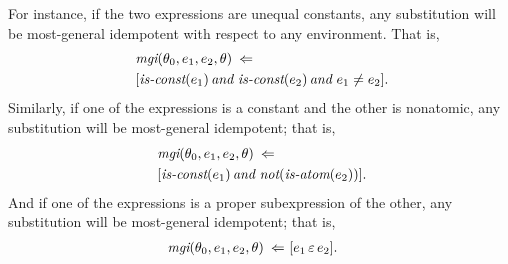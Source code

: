 \documentclass[runningheads]{llncs}
\DeclareMathOperator{\uand}{\emph{and}\,}
\DeclareMathOperator{\unot}{\emph{not}\kern-.0pt}
\DeclareMathOperator{\uimplies}{\Rightarrow}
\DeclareMathOperator{\uimpliedby}{\Leftarrow}
\DeclareMathOperator{\isatm}{\emph{is-atom}}
\DeclareMathOperator{\iscnst}{\emph{is-const}}
\DeclareMathOperator{\mgi}{\emph{mgi}}
\begin{document}
For instance, if the two expressions are unequal constants, any substitution will be most-general idempotent with respect to any environment. That is,
\begin{align*}
 &{\mgi}(\thet{0}, \e{1}, \e{2}, \theta) \,\, \uimpliedby \\ \,\,
&[\iscnst(\e{1}) \uand \iscnst(\e{2}) \uand \e{1} \neq \e{2} ].
   \end{align*}
Similarly, if one of the expressions is a constant and the other is nonatomic, any substitution will be most-general idempotent; that is, 
\begin{align*}
 &{\mgi}(\thet{0}, \e{1}, \e{2}, \theta) \,\, \uimpliedby \\ \,\,
&[\iscnst(\e{1}) \uand \unot(\isatm(\e{2}))].
   \end{align*}
And if one of the expressions is a proper subexpression of the other, any substitution will be most-general idempotent; that is, 
\begin{align*}
 &{\mgi}(\thet{0}, \e{1}, \e{2}, \theta) \,\, \uimpliedby \,\,
[\e{1} \occursin \e{2}].
   \end{align*}



\begin{comment}
The condition that $\theta' \neq \fail$ can be dropped from the antecedent of the above definition of the relative most-general idempotent relation because, when it doesn't hold, the conclusion holds automatically; $\theta \moregen \theta'$
is always true if $\theta'$ is $\fail$. Therefore we can say that ${\mgi} (\thet{0}, \e{1}, \e{2}, \theta)$ holds, by the \emph{abbreviated definition of $\mgi$,} precisely when 
\begin{align*}
 (\forall \theta') \left[{
 \begin {aligned} &\e{1} \apply \theta' = \e{2} \apply \theta' \, \uand \,   
  \thet{0} \moregen \theta' \,\uimplies\\
                    &\theta \moregen \theta'
   \end{aligned}}
   \right]. \end{align*}
\end{comment}
\end{document}
